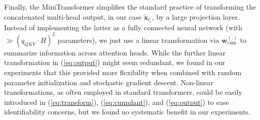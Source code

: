 \documentclass[AMA,Times1COL]{WileyNJDv5} %
\begin{document}
Finally, the MiniTransformer simplifies the standard practice of transforming the concatenated multi-head output, in our case $\tilde{\mathbf{x}}_{t_i}$, by a large projection layer. Instead of implementing the latter as a fully connected neural network (with $\gg (q_{QKV}\cdot H)^2$ parameters), we just use a linear transformation via \(\mathbf{w}^{(.)}_\mathrm{cum}\) to summarize information across attention heads. While the further linear transformation in (\ref{eq:output}) might seem redundant, we found in our experiments that this provided more flexibility when combined with random parameter initialization and stochastic gradient descent. Non-linear transformations, as often employed in standard transformers, could be easily introduced in (\ref{eq:transform}), (\ref{eq:cumulant}), and (\ref{eq:output}) to ease identifiability concerns, but we found no systematic benefit in our experiments.







\end{document}
